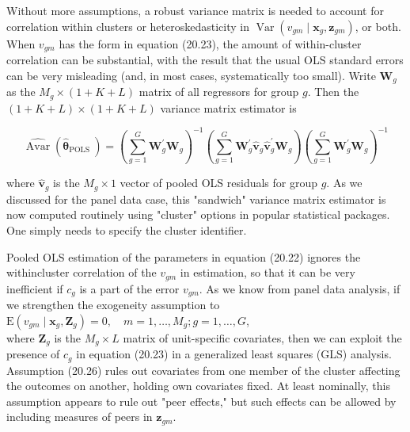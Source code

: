 \documentclass[10pt]{article}
\begin{document}
Without more assumptions, a robust variance matrix is needed to account for correlation within clusters or heteroskedasticity in $\operatorname{Var}\left(v_{g m} \mid \mathbf{x}_{g}, \mathbf{z}_{g m}\right)$, or both. When $v_{g m}$ has the form in equation (20.23), the amount of within-cluster correlation can be substantial, with the result that the usual OLS standard errors can be very misleading (and, in most cases, systematically too small). Write $\mathbf{W}_{g}$ as the $M_{g} \times(1+K+L)$ matrix of all regressors for group $g$. Then the $(1+K+L) \times(1+K+L)$ variance matrix estimator is


\begin{equation*}
\widehat{\operatorname{Avar}}\left(\hat{\boldsymbol{\theta}}_{\text {POLS }}\right)=\left(\sum_{g=1}^{G} \mathbf{W}_{g}^{\prime} \mathbf{W}_{g}\right)^{-1}\left(\sum_{g=1}^{G} \mathbf{W}_{g}^{\prime} \hat{\mathbf{v}}_{g} \hat{\mathbf{v}}_{g}^{\prime} \mathbf{W}_{g}\right)\left(\sum_{g=1}^{G} \mathbf{W}_{g}^{\prime} \mathbf{W}_{g}\right)^{-1} \tag{20.25}
\end{equation*}


where $\hat{\mathbf{v}}_{g}$ is the $M_{g} \times 1$ vector of pooled OLS residuals for group $g$. As we discussed for the panel data case, this "sandwich" variance matrix estimator is now computed routinely using "cluster" options in popular statistical packages. One simply needs to specify the cluster identifier.

Pooled OLS estimation of the parameters in equation (20.22) ignores the withincluster correlation of the $v_{g m}$ in estimation, so that it can be very inefficient if $c_{g}$ is a part of the error $v_{g m}$. As we know from panel data analysis, if we strengthen the exogeneity assumption to\\
$\mathrm{E}\left(v_{g m} \mid \mathbf{x}_{g}, \mathbf{Z}_{g}\right)=0, \quad m=1, \ldots, M_{g} ; g=1, \ldots, G$,\\
where $\mathbf{Z}_{g}$ is the $M_{g} \times L$ matrix of unit-specific covariates, then we can exploit the presence of $c_{g}$ in equation (20.23) in a generalized least squares (GLS) analysis. Assumption (20.26) rules out covariates from one member of the cluster affecting the outcomes on another, holding own covariates fixed. At least nominally, this assumption appears to rule out "peer effects," but such effects can be allowed by including measures of peers in $\mathbf{z}_{g m}$.
\end{document}
